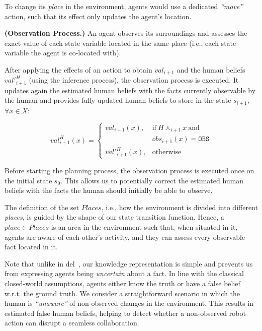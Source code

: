 {To change its \textit{place} in the environment, agents would use a dedicated \textit{``move''} action, such that its effect only updates the agent's location. 

\begin{definition} 
\label{def:new_obs}
    \textbf{(Observation Process.)} An agent observes its surroundings and assesses the exact value of each state variable located in the same place (i.e., each state variable the agent is co-located with).
\end{definition}

After applying the effects of an action to obtain $val_{i+1}$ and the human beliefs $val'^H_{i+1}$ (using the inference process), the observation process is executed. It updates again the estimated human beliefs with the facts currently observable by the human and provides fully updated human beliefs to store in the state $s_{i+1}$, $\forall x \in X$:

\begin{equation}
val^H_{i+1}(x) = \left\{ 
\begin{array}{ll}
val_{i+1}(x), & \mbox{if}~ H \curlywedge_{i+1} x ~\mbox{and}~ \\
    & obs_{i+1}(x) = \texttt{OBS}\\
val'^H_{i+1}(x), & \mbox{otherwise}
\end{array}\right.
\end{equation}

Before starting the planning process, the observation process is executed once on the initial state $s_0$. This allows us to potentially correct the estimated human beliefs with the facts the human should initially be able to observe. 

The definition of the set $Places$, i.e., how the environment is divided into different \textit{places}, is guided by the shape of our state transition function. Hence, a $place \in Places$ is an area in the environment such that, when situated in it, agents are aware of each other's activity, and they can assess every observable fact located in it. 

Note that unlike in \acrshort{del}~\cite{KR2021-12}, our knowledge representation is simple and prevents us from expressing agents being \textit{uncertain} about a fact. 
In line with the classical closed-world assumptions, agents either know the truth or have a false belief w.r.t. the ground truth. 
We consider a straightforward scenario in which the human is \textit{``unaware''} of non-observed changes in the environment. 
This results in estimated false human beliefs, helping to detect whether a non-observed robot action can disrupt a seamless collaboration. 

}
